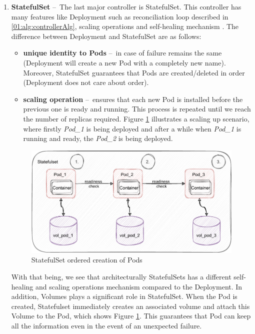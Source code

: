 \begin{enumerate}
    \item \textbf{StatefulSet} \---\ The last major controller is StatefulSet. This controller has many features like Deployment such as reconciliation loop described in \ref{01:alg:controllerAlg}, scaling operations and self-healing mechanism . The difference between Deployment and StatefulSet are as follows:
    \begin{itemize}
        \item \textbf{unique identity to Pods} \---\ in case of failure remains the same (Deployment will create a new Pod with a completely new name). Moreover, StatefulSet guarantees that Pods are created/deleted in order (Deployment does not care about order).  
        \item \textbf{scaling operation} \---\  ensures that each new Pod is installed before the previous one is ready and running. This process is repeated until we reach the number of replicas required. Figure \ref{02:fig:statefulsetOrderedCreation} illustrates a scaling up scenario, where firstly \emph{Pod\_1} is being deployed and after a while when \emph{Pod\_1} is running and ready, the \emph{Pod\_2} is being deployed.
    \end{itemize}
    
    \begin{figure}[!h]
    \centering
    \includegraphics[scale=1]{obrazky-figures/02-preliminaries/01-kubernetes/04-statefuset_with_volume.pdf}
    \caption{StatefulSet ordered creation of Pods}
    \label{02:fig:statefulsetOrderedCreation}
\end{figure}

    With that being, we see that architecturally StatefulSets has a different self-healing and scaling operations mechanism compared to the Deployment. In addition, Volumes plays a significant role in StatefulSet. When the Pod is created, Statefulset immediately creates an associated volume and attach this Volume to the Pod, which shows Figure \ref{02:fig:statefulsetOrderedCreation}. This guarantees that Pod can keep all the information even in the event of an unexpected failure. 

\end{enumerate}